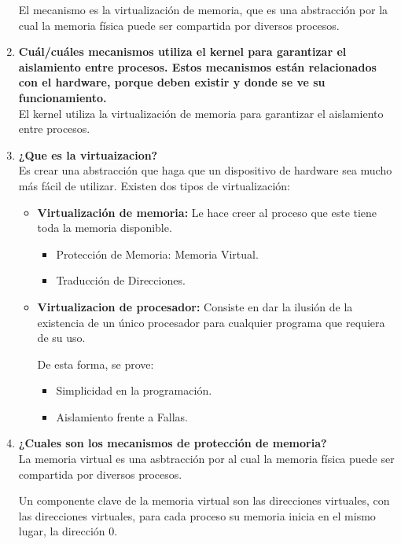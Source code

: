 \documentclass[../main.tex]{subfiles}
\begin{document}
\begin{enumerate}
                El mecanismo es la virtualización de memoria, que es una abstracción por la cual la memoria física puede ser compartida por diversos procesos.
            \item \textbf{Cuál/cuáles mecanismos utiliza el kernel para garantizar el aislamiento entre procesos. Estos mecanismos están relacionados con el hardware, porque deben existir y donde se ve su funcionamiento.}\\
                El kernel utiliza la virtualización de memoria para garantizar el aislamiento entre procesos.
            \item \textbf{¿Que es la virtuaizacion?}\\
                Es crear una abstracción que haga que un dispositivo de hardware sea mucho más fácil de utilizar.
                Existen dos tipos de virtualización:
                \begin{itemize}
                    \item \textbf{Virtualización de memoria:} Le hace creer al proceso que este tiene toda la memoria disponible.
                        \begin{itemize}
                            \item Protección de Memoria: Memoria Virtual.
                            \item Traducción de Direcciones.
                        \end{itemize} 
                    \item \textbf{Virtualizacion de procesador:} Consiste en dar la ilusión de la existencia de un único procesador para cualquier programa que requiera de su uso.
                    
                    De esta forma, se prove:
                    \begin{itemize}
                        \item Simplicidad en la programación.
                        \item Aislamiento frente a Fallas.
                    \end{itemize}
                \end{itemize}
            \item \textbf{¿Cuales son los mecanismos de protección de memoria?}\\
                La memoria virtual es una asbtracción por al cual la memoria física puede ser compartida por diversos procesos.

                Un componente clave de la memoria virtual son las direcciones virtuales, con las direcciones virtuales, para cada proceso su memoria inicia en el mismo lugar, la dirección 0. 
                

\end{enumerate}
\end{document}
